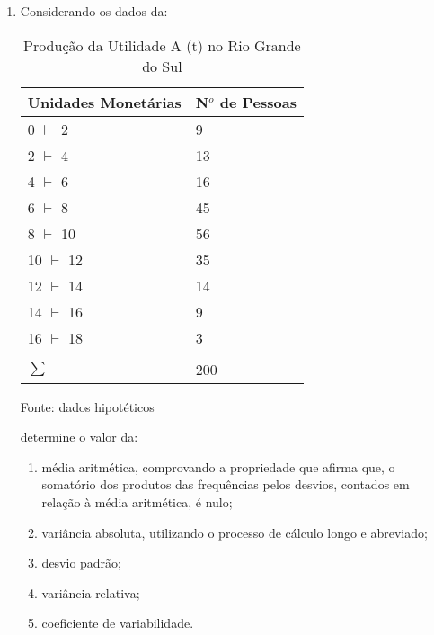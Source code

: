\begin{enumerate}
\item Considerando os dados da:
	\begin{table}[!htb]
	\centering
	\caption{Produção da Utilidade A (t) no Rio Grande do Sul}
	\vspace{0.5cm}
	\begin{tabular}{ll}
	Unidades Monetárias & N$^o$ de Pessoas \\
	\hline 
	0 $\vdash$ 2 & 9 \\
	2 $\vdash$ 4 & 13 \\
	4 $\vdash$ 6 & 16 \\
	6 $\vdash$ 8 & 45  \\
	8 $\vdash$ 10 & 56 \\
	10 $\vdash$ 12 & 35  \\
	12 $\vdash$ 14 & 14  \\
	14 $\vdash$ 16 & 9 \\
	16 $\vdash$ 18 & 3 \\ \\ \hline 
	$\sum$ & 200  \\ \hline 
	\end{tabular}
	 \newline \newline Fonte: dados hipotéticos
	\end{table}
	determine o valor da:
	\begin{enumerate}
		\item média aritmética, comprovando a propriedade que afirma que, o somatório dos produtos das frequências pelos desvios, contados em relação à média aritmética, é nulo;
		\item variância absoluta, utilizando o processo de cálculo longo e abreviado;
		\item desvio padrão;
		\item variância relativa;
		\item coeficiente de variabilidade.
	\end{enumerate}


\end{enumerate}
